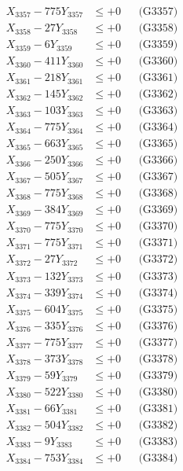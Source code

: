 \documentclass[a4paper,10pt]{article}
\begin{document}
{\begin{align}
X_{3357} - 775Y_{3357} &\leq +0 && \text{(G3357)} \\
X_{3358} - 27Y_{3358} &\leq +0 && \text{(G3358)} \\
X_{3359} - 6Y_{3359} &\leq +0 && \text{(G3359)} \\
X_{3360} - 411Y_{3360} &\leq +0 && \text{(G3360)} \\
\allowbreak
X_{3361} - 218Y_{3361} &\leq +0 && \text{(G3361)} \\
X_{3362} - 145Y_{3362} &\leq +0 && \text{(G3362)} \\
X_{3363} - 103Y_{3363} &\leq +0 && \text{(G3363)} \\
X_{3364} - 775Y_{3364} &\leq +0 && \text{(G3364)} \\
X_{3365} - 663Y_{3365} &\leq +0 && \text{(G3365)} \\
X_{3366} - 250Y_{3366} &\leq +0 && \text{(G3366)} \\
X_{3367} - 505Y_{3367} &\leq +0 && \text{(G3367)} \\
X_{3368} - 775Y_{3368} &\leq +0 && \text{(G3368)} \\
X_{3369} - 384Y_{3369} &\leq +0 && \text{(G3369)} \\
X_{3370} - 775Y_{3370} &\leq +0 && \text{(G3370)} \\
\allowbreak
X_{3371} - 775Y_{3371} &\leq +0 && \text{(G3371)} \\
X_{3372} - 27Y_{3372} &\leq +0 && \text{(G3372)} \\
X_{3373} - 132Y_{3373} &\leq +0 && \text{(G3373)} \\
X_{3374} - 339Y_{3374} &\leq +0 && \text{(G3374)} \\
X_{3375} - 604Y_{3375} &\leq +0 && \text{(G3375)} \\
X_{3376} - 335Y_{3376} &\leq +0 && \text{(G3376)} \\
X_{3377} - 775Y_{3377} &\leq +0 && \text{(G3377)} \\
X_{3378} - 373Y_{3378} &\leq +0 && \text{(G3378)} \\
X_{3379} - 59Y_{3379} &\leq +0 && \text{(G3379)} \\
X_{3380} - 522Y_{3380} &\leq +0 && \text{(G3380)} \\
\allowbreak
X_{3381} - 66Y_{3381} &\leq +0 && \text{(G3381)} \\
X_{3382} - 504Y_{3382} &\leq +0 && \text{(G3382)} \\
X_{3383} - 9Y_{3383} &\leq +0 && \text{(G3383)} \\
X_{3384} - 753Y_{3384} &\leq +0 && \text{(G3384)} \\

\end{align}}
\end{document}
